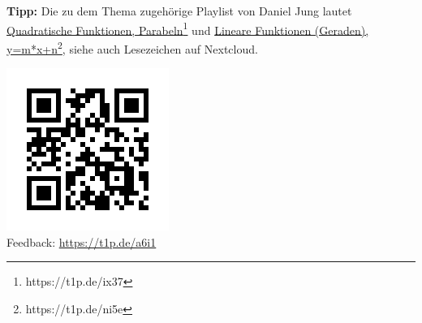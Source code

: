 \documentclass[a4paper,ngerman,12pt]{exam}
\begin{document}
\begin{questions}
\begin{solution}
    \end{solution}
















\end{questions}

\par \textbf{Tipp:} Die zu dem Thema zugehörige Playlist von Daniel Jung lautet \href{https://t1p.de/ix37}{Quadratische Funktionen, Parabeln\footnote{\url{https://t1p.de/ix37}}} und \href{https://t1p.de/ni5e}{Lineare Funktionen (Geraden), y=m*x+n\footnote{\url{https://t1p.de/ni5e}}}, siehe auch Lesezeichen auf Nextcloud.
\vspace{1cm}

\includegraphics[scale=0.4]{qr-code-t1p-de-a6i1}\\
Feedback: \href{https://t1p.de/a6i1}{https://t1p.de/a6i1}
\end{document}
